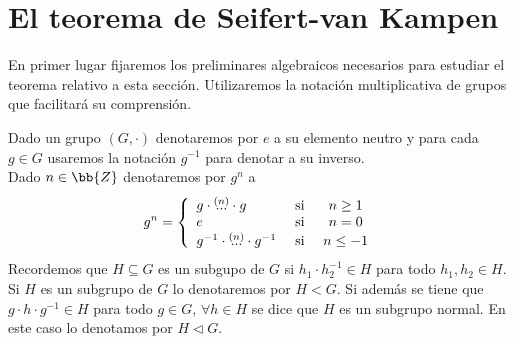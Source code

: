 \begin{teo}
\begin{figure}[H]
    \end{figure}
\end{teo}

\section{El teorema de Seifert-van Kampen}

En primer lugar fijaremos los preliminares algebraicos necesarios para estudiar el teorema relativo a esta sección. Utilizaremos la notación multiplicativa de grupos que facilitará su comprensión.

\begin{notacion}
    Dado un grupo $(G, \cdot)$ denotaremos por $e$ a su elemento neutro y para cada $g\in G$ usaremos la notación $g^{-1}$ para denotar a su inverso.\\

    Dado $n\in \bb{Z}$ denotaremos por $g^n$ a 
    \begin{gather*}
        g^n = \left\{
            \begin{array}{l c c}
                g\cdot \overset{(n)}{...} \cdot g & \text{ si } & n\geq 1\\
                e & \text{ si } & n=0\\
                g^{-1}\cdot \overset{(n)}{...} \cdot g^{-1} & \text{ si } & n\leq -1
            \end{array}
        \right.
    \end{gather*}
    Recordemos que $H\subseteq G$ es un subgupo de $G$ si $h_1\cdot h_2^{-1}\in H$ para todo $h_1,h_2\in H$.\\

    Si $H$ es un subgrupo de $G$ lo denotaremos por $H<G$. Si además se tiene que $g\cdot h \cdot g^{-1}\in H$ para todo $g\in G$, $\forall h \in H$ se dice que $H$ es un subgrupo normal. En este caso lo denotamos por $H \lhd G$.
\end{notacion}

